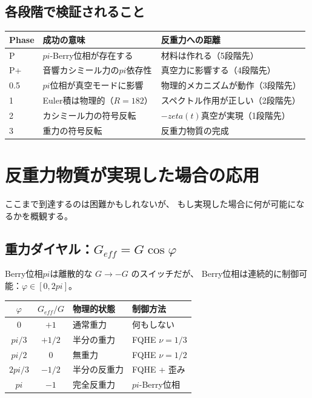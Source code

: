 \documentclass[11pt,a4paper]{article}
\def\pi{pi}%
\def\zeta{zeta}%
\def\mathrm#1{#1}%
\def\textbf#1{#1}%
\begin{document}
\subsection{各段階で検証されること}

\begin{center}
\begin{tabular}{llp{5.5cm}}
\toprule
Phase & 成功の意味 & 反重力への距離 \\
\midrule
P & $\pi$-Berry位相が存在する & 材料は作れる（5段階先） \\
P+ & 音響カシミール力の$\pi$依存性 & 真空力に影響する（4段階先） \\
0.5 & $\pi$位相が真空モードに影響 & 物理的メカニズムが動作（3段階先） \\
1 & Euler積は物理的（$R=182$） & スペクトル作用が正しい（2段階先） \\
2 & カシミール力の符号反転 & $-\zeta(t)$真空が実現（1段階先） \\
3 & 重力の符号反転 & \textbf{反重力物質の完成} \\
\bottomrule
\end{tabular}
\end{center}


\section{反重力物質が実現した場合の応用}

ここまで到達するのは困難かもしれないが、
もし実現した場合に何が可能になるかを概観する。

\subsection{重力ダイヤル：$G_{\mathrm{eff}} = G\cos\varphi$}

Berry位相$\pi$は離散的な $G \to -G$ のスイッチだが、
Berry位相は連続的に制御可能：$\varphi \in [0, 2\pi]$。

\begin{center}
\begin{tabular}{ccll}
\toprule
$\varphi$ & $G_{\mathrm{eff}}/G$ & 物理的状態 & 制御方法 \\
\midrule
$0$ & $+1$ & 通常重力 & 何もしない \\
$\pi/3$ & $+1/2$ & 半分の重力 & FQHE $\nu=1/3$ \\
$\pi/2$ & $0$ & \textbf{無重力} & FQHE $\nu=1/2$ \\
$2\pi/3$ & $-1/2$ & 半分の反重力 & FQHE + 歪み \\
$\pi$ & $-1$ & \textbf{完全反重力} & $\pi$-Berry位相 \\
\bottomrule
\end{tabular}
\end{center}
\end{document}
